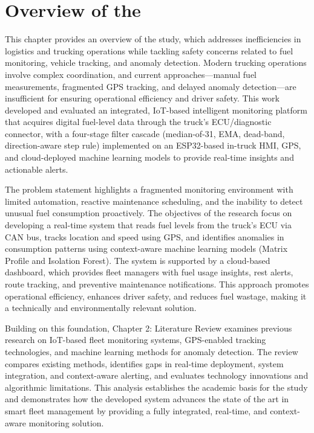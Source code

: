 \section{Overview of the \documentType}

This chapter provides an overview of the study, which addresses inefficiencies in logistics and trucking operations while tackling safety concerns related to fuel monitoring, vehicle tracking, and anomaly detection. Modern trucking operations involve complex coordination, and current approaches—manual fuel measurements, fragmented GPS tracking, and delayed anomaly detection—are insufficient for ensuring operational efficiency and driver safety. This work developed and evaluated an integrated, IoT-based intelligent monitoring platform that acquires digital fuel-level data through the truck's ECU/diagnostic connector, with a four-stage filter cascade (median-of-31, EMA, dead-band, direction-aware step rule) implemented on an ESP32-based in-truck HMI, GPS, and cloud-deployed machine learning models to provide real-time insights and actionable alerts.

The problem statement highlights a fragmented monitoring environment with limited automation, reactive maintenance scheduling, and the inability to detect unusual fuel consumption proactively. The objectives of the research focus on developing a real-time system that reads fuel levels from the truck’s ECU via CAN bus, tracks location and speed using GPS, and identifies anomalies in consumption patterns using context-aware machine learning models (Matrix Profile and Isolation Forest). The system is supported by a cloud-based dashboard, which provides fleet managers with fuel usage insights, rest alerts, route tracking, and preventive maintenance notifications. This approach promotes operational efficiency, enhances driver safety, and reduces fuel wastage, making it a technically and environmentally relevant solution.

Building on this foundation, Chapter 2: Literature Review examines previous research on IoT-based fleet monitoring systems, GPS-enabled tracking technologies, and machine learning methods for anomaly detection. The review compares existing methods, identifies gaps in real-time deployment, system integration, and context-aware alerting, and evaluates technology innovations and algorithmic limitations. This analysis establishes the academic basis for the study and demonstrates how the developed system advances the state of the art in smart fleet management by providing a fully integrated, real-time, and context-aware monitoring solution.
